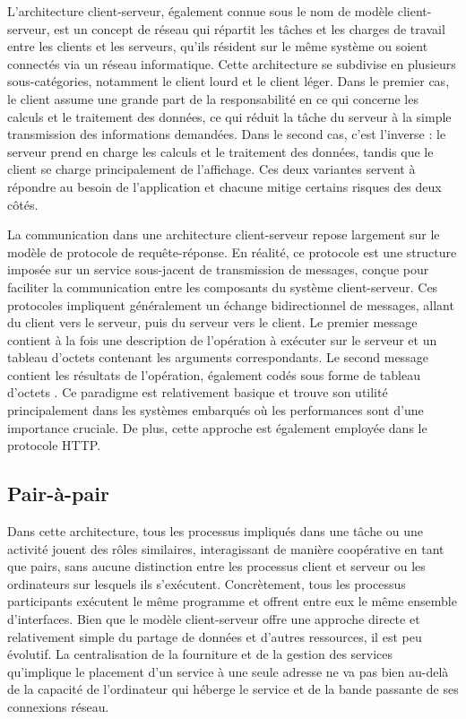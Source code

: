 L'architecture client-serveur, également connue sous le nom de modèle client-serveur, est un concept de réseau qui répartit les tâches et les charges de travail entre les clients et les serveurs, qu'ils résident sur le même système ou soient connectés via un réseau informatique. Cette architecture se subdivise en plusieurs sous-catégories, notamment le client lourd et le client léger. Dans le premier cas, le client assume une grande part de la responsabilité en ce qui concerne les calculs et le traitement des données, ce qui réduit la tâche du serveur à la simple transmission des informations demandées. Dans le second cas, c'est l'inverse : le serveur prend en charge les calculs et le traitement des données, tandis que le client se charge principalement de l'affichage. Ces deux variantes servent à répondre au besoin de l'application et chacune mitige certains risques des deux côtés.

La communication dans une architecture client-serveur repose largement sur le modèle de protocole de requête-réponse. En réalité, ce protocole est une structure imposée sur un service sous-jacent de transmission de messages, conçue pour faciliter la communication entre les composants du système client-serveur. Ces protocoles impliquent généralement un échange bidirectionnel de messages, allant du client vers le serveur, puis du serveur vers le client. Le premier message contient à la fois une description de l'opération à exécuter sur le serveur et un tableau d'octets contenant les arguments correspondants. Le second message contient les résultats de l'opération, également codés sous forme de tableau d'octets \cite{Coulouris_2012}. Ce paradigme est relativement basique et trouve son utilité principalement dans les systèmes embarqués où les performances sont d'une importance cruciale. De plus, cette approche est également employée dans le protocole HTTP.

\subsection{Pair-à-pair}

Dans cette architecture, tous les processus impliqués dans une tâche ou une activité jouent des rôles similaires, interagissant de manière coopérative en tant que pairs, sans aucune distinction entre les processus client et serveur ou les ordinateurs sur lesquels ils s'exécutent. Concrètement, tous les processus participants exécutent le même programme et offrent entre eux le même ensemble d'interfaces. Bien que le modèle client-serveur offre une approche directe et relativement simple du partage de données et d'autres ressources, il est peu évolutif. La centralisation de la fourniture et de la gestion des services qu'implique le placement d'un service à une seule adresse ne va pas bien au-delà de la capacité de l'ordinateur qui héberge le service et de la bande passante de ses connexions réseau.

